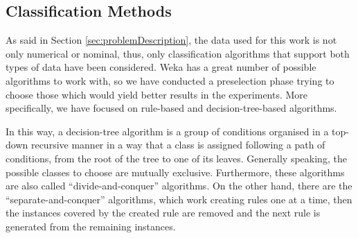 \documentclass{llncs}
\begin{document}
%
\subsection{Classification Methods}
\label{subsec:methods}



\noindent As said in Section \ref{sec:problemDescription}, the data used for this work is not only numerical or nominal, thus, only classification algorithms that support both types of data have been considered. Weka has a great number of possible algorithms to work with, so we have conducted a preselection phase trying to choose those which would yield better results in the experiments. More specifically, we have focused on rule-based and decision-tree-based algorithms. 


In this way, a decision-tree algorithm is a group of conditions organised in a top-down recursive manner in a way that a class is assigned following a path of conditions, from the root of the tree to one of its leaves. Generally speaking, the possible classes to choose are mutually exclusive. Furthermore, these algorithms are also called ``divide-and-conquer'' algorithms. On the other hand, there are the ``separate-and-conquer'' algorithms, which work creating rules one at a time, then the instances covered by the created rule are removed and the next rule is generated from the remaining instances.
\end{document}
